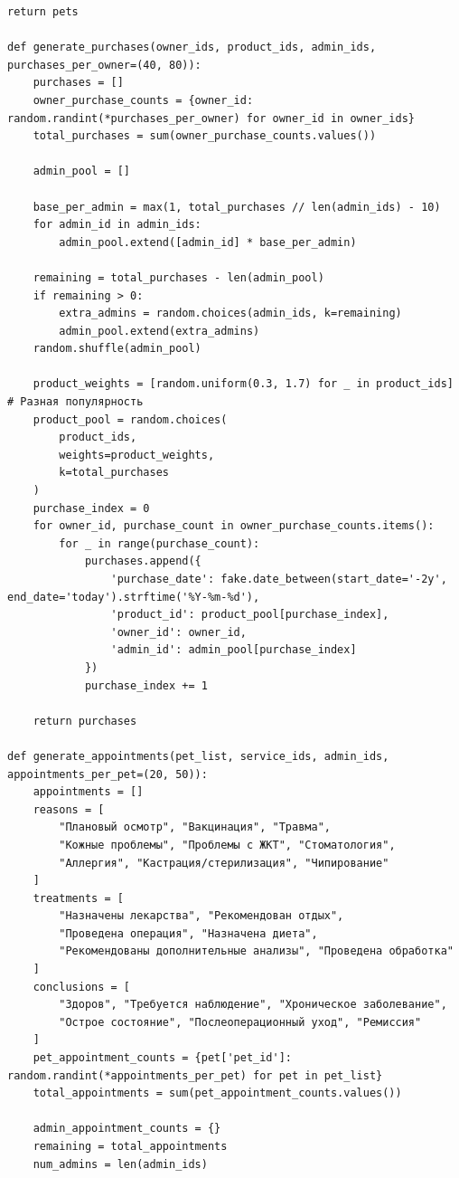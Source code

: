\documentclass[a4paper]{article}
\begin{document}
\begin{lstlisting}[caption = Генерация значений для таблиц, basicstyle= \scriptsize \ttfamily]
    return pets

def generate_purchases(owner_ids, product_ids, admin_ids, purchases_per_owner=(40, 80)):
    purchases = []
    owner_purchase_counts = {owner_id: random.randint(*purchases_per_owner) for owner_id in owner_ids}
    total_purchases = sum(owner_purchase_counts.values())

    admin_pool = []

    base_per_admin = max(1, total_purchases // len(admin_ids) - 10)
    for admin_id in admin_ids:
        admin_pool.extend([admin_id] * base_per_admin)

    remaining = total_purchases - len(admin_pool)
    if remaining > 0:
        extra_admins = random.choices(admin_ids, k=remaining)
        admin_pool.extend(extra_admins)
    random.shuffle(admin_pool)  

    product_weights = [random.uniform(0.3, 1.7) for _ in product_ids]  # Разная популярность
    product_pool = random.choices(
        product_ids, 
        weights=product_weights,
        k=total_purchases
    )
    purchase_index = 0
    for owner_id, purchase_count in owner_purchase_counts.items():
        for _ in range(purchase_count):
            purchases.append({
                'purchase_date': fake.date_between(start_date='-2y', end_date='today').strftime('%Y-%m-%d'),
                'product_id': product_pool[purchase_index],
                'owner_id': owner_id,
                'admin_id': admin_pool[purchase_index]
            })
            purchase_index += 1
    
    return purchases

def generate_appointments(pet_list, service_ids, admin_ids, appointments_per_pet=(20, 50)):
    appointments = []
    reasons = [
        "Плановый осмотр", "Вакцинация", "Травма", 
        "Кожные проблемы", "Проблемы с ЖКТ", "Стоматология",
        "Аллергия", "Кастрация/стерилизация", "Чипирование"
    ]
    treatments = [
        "Назначены лекарства", "Рекомендован отдых", 
        "Проведена операция", "Назначена диета",
        "Рекомендованы дополнительные анализы", "Проведена обработка"
    ]
    conclusions = [
        "Здоров", "Требуется наблюдение", "Хроническое заболевание",
        "Острое состояние", "Послеоперационный уход", "Ремиссия"
    ]
    pet_appointment_counts = {pet['pet_id']: random.randint(*appointments_per_pet) for pet in pet_list}
    total_appointments = sum(pet_appointment_counts.values())
    
    admin_appointment_counts = {}
    remaining = total_appointments
    num_admins = len(admin_ids)
    

\end{lstlisting}
\end{document}

